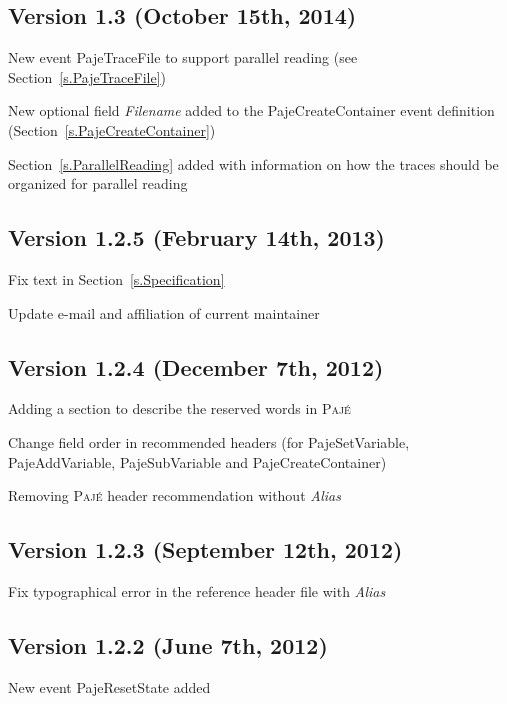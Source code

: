 \documentclass[12pt]{article}
\newcommand{\Paje}{\textsc{Paj\'e}\xspace}
\newcommand{\PajeField}[1]{\emph{#1}\xspace}
\newcommand{\Alias}{\PajeField{Alias}}
\newcommand{\Filename}{\PajeField{Filename}}
\newcommand{\PajeEvent}[1]{\textsf{#1}\xspace}
\newcommand{\PajeCreateContainer}{\PajeEvent{PajeCreateContainer}}
\newcommand{\PajeResetState}{\PajeEvent{PajeResetState}}
\newcommand{\PajeSetVariable}{\PajeEvent{PajeSetVariable}}
\newcommand{\PajeAddVariable}{\PajeEvent{PajeAddVariable}}
\newcommand{\PajeSubVariable}{\PajeEvent{PajeSubVariable}}
\newcommand{\PajeTraceFile}{\PajeEvent{PajeTraceFile}}
\newenvironment{itemize*}%
               {\vspace{-1em}
                 \begin{itemize}%
                   \setlength{\itemsep}{0pt}%
                   \setlength{\parskip}{0pt}}%
               {\end{itemize}}
\begin{document}
\subsection*{Version 1.3 (October 15th, 2014)}
\begin{itemize*}
\item New event \PajeTraceFile to support parallel reading (see Section~\ref{s.PajeTraceFile})
\item New optional field \Filename added to the \PajeCreateContainer event definition (Section~\ref{s.PajeCreateContainer})
\item Section~\ref{s.ParallelReading} added with information on how the traces should be organized for parallel reading
\end{itemize*}

\subsection*{Version 1.2.5 (February 14th, 2013)}
\begin{itemize*}
\item Fix text in Section~\ref{s.Specification}
\item Update e-mail and affiliation of current maintainer
\end{itemize*}

\subsection*{Version 1.2.4 (December 7th, 2012)}
\begin{itemize*}
\item Adding a section to describe the reserved words in \Paje
\item Change field order in recommended headers (for \PajeSetVariable,
  \PajeAddVariable, \PajeSubVariable and \PajeCreateContainer)
\item Removing \Paje header recommendation without \Alias
\end{itemize*}

\subsection*{Version 1.2.3 (September 12th, 2012)}
\begin{itemize*}
\item Fix typographical error in the reference header file with \Alias
\end{itemize*}

\subsection*{Version 1.2.2 (June 7th, 2012)}
\begin{itemize*}
\item New event \PajeResetState added
\end{itemize*}
\end{document}
